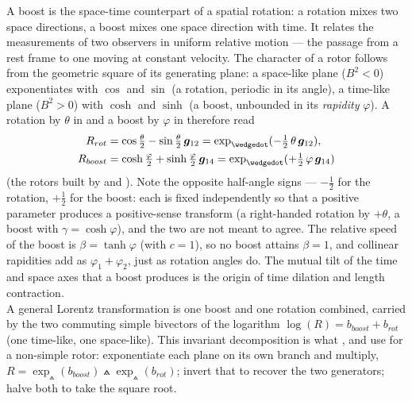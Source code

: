 A boost is the space-time counterpart of a spatial rotation: a rotation mixes two space
directions, a boost mixes one space direction with time. It relates the measurements of
two observers in uniform relative motion --- the passage from a rest frame to one moving
at constant velocity. The character of a rotor follows from the geometric square of its
generating plane: a space-like plane ($B^2 < 0$) exponentiates with $\cos$ and $\sin$ (a
rotation, periodic in its angle), a time-like plane ($B^2 > 0$) with $\cosh$ and $\sinh$
(a boost, unbounded in its \emph{rapidity} $\varphi$). A rotation by $\theta$ in 
and a boost by $\varphi$ in  therefore read
\begin{align}
   R_{rot}   & = \cos\tfrac{\theta}{2} - \sin\tfrac{\theta}{2}\,\gv{12}
               = \exp_\wedgedot(-\tfrac{1}{2}\,\theta\,\gv{12}) , \\
   R_{boost} & = \cosh\tfrac{\varphi}{2} + \sinh\tfrac{\varphi}{2}\,\gv{14}
               = \exp_\wedgedot(+\tfrac{1}{2}\,\varphi\,\gv{14})
\end{align}
(the rotors built by  and ). Note the opposite half-angle
signs --- $-\tfrac{1}{2}$ for the rotation, $+\tfrac{1}{2}$ for the boost: each is fixed
independently so that a positive parameter produces a positive-sense transform (a
right-handed rotation by $+\theta$, a boost with $\gamma = \cosh\varphi$), and the two are
not meant to agree. The relative speed of the boost is $\beta = \tanh\varphi$ (with $c =
1$), so no boost attains $\beta = 1$, and collinear rapidities add as $\varphi_1 +
\varphi_2$, just as rotation angles do. The mutual tilt of the time and space axes that a
boost produces is the origin of time dilation and length contraction. \\

A general Lorentz transformation is one boost and one rotation combined, carried by the
two commuting simple bivectors of the logarithm $\log(R) = b_{boost} + b_{rot}$ (one
time-like, one space-like). This invariant decomposition is what , 
and  use for a non-simple rotor: exponentiate each plane on its own branch and
multiply, $R = \exp_\wedgedot(b_{boost}) \wedgedot \exp_\wedgedot(b_{rot})$; invert that
to recover the two generators; halve both to take the square root. \\

\newpage